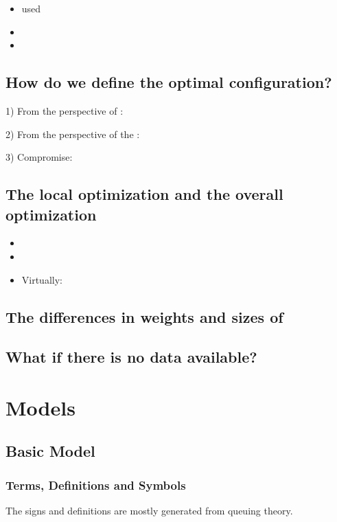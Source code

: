 \documentclass{apmcmthesis}
\begin{document}
\begin{itemize}
  \item used
  \item
  \item
\end{itemize}


\subsection{How do we define the optimal configuration?}
1) From the perspective of      :\par
2) From the perspective of the      :\par
3) Compromise:

\subsection{The local optimization and the overall optimization}


\begin{itemize}
  \item
  \item
  \item Virtually:
\end{itemize}


\subsection{The differences in weights and sizes of}


\subsection{What if there is no data available?}






\section{Models}
\subsection{Basic Model}


\subsubsection{Terms, Definitions and Symbols}
The signs and definitions are mostly generated from queuing theory.
\end{document}
